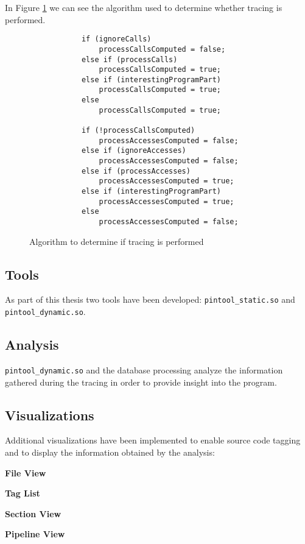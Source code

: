 In Figure \ref{cap3:contralg} we can see the algorithm used to determine whether tracing is performed.

\begin{figure}
	\begin{center}
		\begin{verbatim}
			if (ignoreCalls)
				processCallsComputed = false;
			else if (processCalls)
				processCallsComputed = true;
			else if (interestingProgramPart)
				processCallsComputed = true;
			else
				processCallsComputed = true;
			
			if (!processCallsComputed)
				processAccessesComputed = false;
			else if (ignoreAccesses)
				processAccessesComputed = false;
			else if (processAccesses)
				processAccessesComputed = true;
			else if (interestingProgramPart)
				processAccessesComputed = true;
			else
				processAccessesComputed = false;
		\end{verbatim}
	\end{center}
	\caption{Algorithm to determine if tracing is performed}
	\label{cap3:contralg}
\end{figure}

\subsection{Tools}

As part of this thesis two tools have been developed: \texttt{pintool\_static.so} and \texttt{pintool\_dynamic.so}.

\subsection{Analysis}

\texttt{pintool\_dynamic.so} and the database processing analyze the information gathered during the tracing in order to provide insight into the program. 

\subsection{Visualizations}

Additional visualizations have been implemented to enable source code tagging and to display the information obtained by the analysis:

\textbf{File View}

\textbf{Tag List}

\textbf{Section View}

\textbf{Pipeline View}

